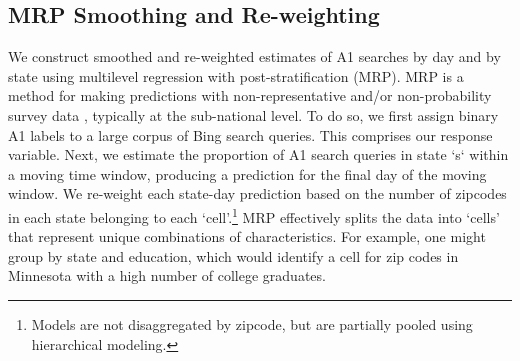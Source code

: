 \documentclass[fleqn,10pt]{wlscirep}
\begin{document}


\subsection*{MRP Smoothing and Re-weighting}

We construct smoothed and re-weighted estimates of A1 searches by day and by state using multilevel regression with post-stratification (MRP). MRP is a method for making predictions with non-representative and/or non-probability survey data \cite{park_gelman_bafumi_2004}, typically at the sub-national level. To do so, we first assign binary A1 labels to a large corpus of Bing search queries. This comprises our response variable. Next, we estimate the proportion of A1 search queries in state `s` within a moving time window, producing a prediction for the final day of the moving window. We re-weight each state-day prediction based on the number of zipcodes in each state belonging to each `cell'.\footnote{Models are not disaggregated by zipcode, but are partially pooled using hierarchical modeling.} MRP effectively splits the data into `cells' that represent unique combinations of characteristics. For example, one might group by state and education, which would identify a cell for zip codes in Minnesota with a high number of college graduates.
\end{document}
